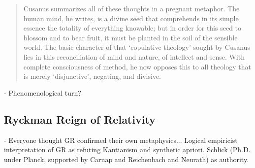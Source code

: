 \begin{quote}
    Cusanus summarizes all of these thoughts in a pregnant metaphor.  The human mind, he writes, is a divine seed that comprehends in its simple essence the totality of everything knowable; but in order for this seed to blossom and to bear fruit, it must be planted in the soil of the sensible world.  The basic character of that `copulative theology' sought by Cusanus lies in this reconciliation of mind and nature, of intellect and sense.  With complete consciousness of method, he now opposes this to all theology that is merely `disjunctive', negating, and divisive.

    \citep[p. 44-45]{Cassirer1927}
\end{quote}

- Phenomenological turn?

\subsection{Ryckman Reign of Relativity}

- Everyone thought GR confirmed their own metaphysics... Logical empiricist interpretation of GR as refuting Kantianism and synthetic apriori.  Schlick (Ph.D. under Planck, supported by Carnap and Reichenbach and Neurath) as authority.  

